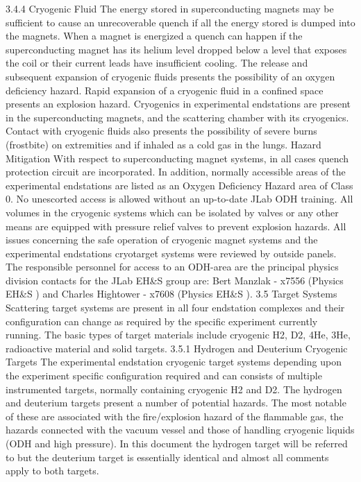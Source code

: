 {{{3.4.4		Cryogenic Fluid 		
	The energy stored in superconducting magnets may be sufficient to cause an unrecoverable quench if all the energy stored is dumped into the magnets. When a magnet is energized a quench can happen if the superconducting magnet has its helium level dropped below a level that exposes the coil or their current leads have insufficient cooling. The release and subsequent expansion of cryogenic fluids presents the possibility of an oxygen deficiency hazard. Rapid expansion of a cryogenic fluid in a confined space presents an explosion hazard. Cryogenics in experimental endstations are present in the superconducting magnets, and the scattering chamber with its cryogenics. Contact with cryogenic fluids also presents the possibility of severe burns (frostbite) on extremities and if inhaled as a cold gas in the lungs.
Hazard Mitigation	
	With respect to superconducting magnet systems, in all cases quench protection circuit are incorporated. In addition, normally accessible areas of the experimental endstations are listed as an Oxygen Deficiency Hazard area of Class 0. No unescorted access is allowed without an up-to-date JLab ODH training. All volumes in the cryogenic systems which can be isolated by valves or any other means are equipped with pressure relief valves to prevent explosion hazards. All issues concerning the safe operation of cryogenic magnet systems and the experimental endstations cryotarget systems were reviewed by outside panels. The responsible personnel for access to an ODH-area are the principal physics division contacts for the JLab EH\&S group are: Bert Manzlak - x7556 (Physics EH\&S ) and Charles Hightower - x7608 (Physics EH\&S ).
3.5	Target Systems
	Scattering target systems are present in all four endstation complexes and their configuration can change as required by the specific experiment currently running. The basic types of target materials include cryogenic H2, D2, 4He, 3He, radioactive material and solid targets. 
3.5.1	Hydrogen and Deuterium Cryogenic Targets
	The experimental endstation cryogenic target systems depending upon the experiment specific configuration required and can consists of multiple instrumented targets, normally containing cryogenic H2 and D2. The hydrogen and deuterium targets present a number of potential hazards. The most notable of these are associated with the fire/explosion hazard of the flammable gas, the hazards connected with the vacuum vessel and those of handling cryogenic liquids (ODH and high pressure). In this document the hydrogen target will be referred to but the deuterium target is essentially identical and almost all comments apply to both targets.
}}}

